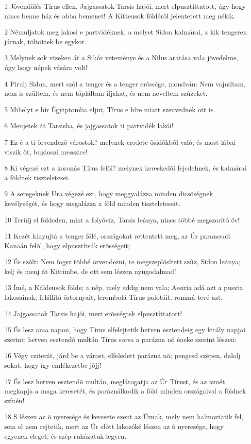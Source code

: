 \par 1 Jövendölés Tírus ellen. Jajgassatok Tarsis hajói, mert elpusztíttatott, úgy hogy nincs benne ház és abba bemenet! A Kitteusok földérõl jelentetett meg nékik.
\par 2 Némuljatok meg lakosi e partvidéknek, a melyet Sidon kalmárai, a kik tengeren járnak, töltöttek be egykor.
\par 3 Melynek sok vizeken át a Sihór veteménye és a Nilus aratása vala jövedelme, úgy hogy népek vására volt!
\par 4 Pirulj Sidon, mert szól a tenger és a tenger erõssége, mondván: Nem vajudtam, nem is szültem, és nem tápláltam ifjakat, és nem neveltem szûzeket.
\par 5 Mihelyt e hír Égyiptomba eljut, Tírus e híre miatt szenvednek ott is.
\par 6 Menjetek át Tarsisba, és jajgassatok ti partvidék lakói!
\par 7 Ez-é a ti örvendezõ várostok? melynek eredete õsidõkbõl való; és most lábai viszik õt, bujdosni messzire!
\par 8 Ki végezé ezt a koronás Tírus felõl? melynek kereskedõi fejedelmek, és kalmárai a földnek tiszteletesei.
\par 9 A seregeknek Ura végezé ezt, hogy meggyalázza minden dicsõségnek kevélységét, és hogy megalázza a föld minden tiszteleteseit.
\par 10 Terülj el földeden, mint a folyóvíz, Tarsis leánya, nincs többé megszorító öv!
\par 11 Kezét kinyujtá a tenger fölé, országokat rettentett meg, az Úr parancsolt Kanaán felõl, hogy elpusztítsák erõsségeit;
\par 12 És szólt: Nem fogsz többé örvendezni, te megszeplõsített szûz, Sidon leánya; kelj és menj át Kittimbe, de ott sem lészen nyugodalmad!
\par 13 Ímé, a Káldeusok földe; a nép, mely eddig nem vala; Assiria adá azt a puszta lakosainak; felállítá õrtornyait, lerombolá Tírus palotáit, rommá tevé azt.
\par 14 Jajgassatok Tarsis hajói, mert erõsségtek elpusztíttatott!
\par 15 És lesz ama napon, hogy Tírus elfelejtetik hetven esztendeig egy király napjai szerint; hetven esztendõ multán Tírus sorsa a parázna nõ éneke szerint lészen:
\par 16 Végy cziterát, járd be a várost, elfeledett parázna nõ; pengesd szépen, dalolj sokat, hogy így emlékezetbe jõjj!
\par 17 És lesz hetven esztendõ multán, meglátogatja az Úr Tírust, és az ismét megkapja a maga keresetét, és paráználkodik a föld minden országaival a földnek színén!
\par 18 S lészen az õ nyeresége és keresete szent az Úrnak, mely nem halmoztatik fel, sem el nem rejtetik, mert az Úr elõtt lakozóké lészen az õ nyeresége, hogy egyenek eleget, és szép ruházatuk legyen.

